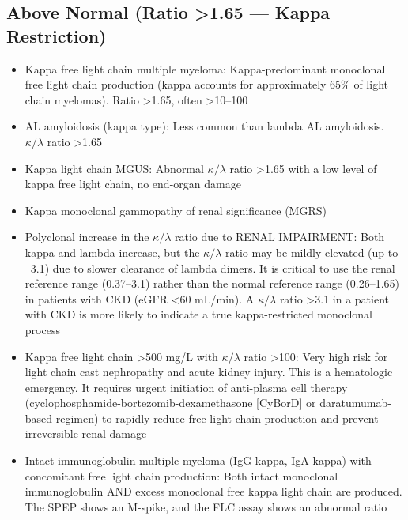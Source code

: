 \subsection*{Above Normal (Ratio >1.65 --- Kappa Restriction)}
\begin{itemize}
  \item Kappa free light chain multiple myeloma: Kappa-predominant monoclonal free light chain production (kappa accounts for approximately 65\% of light chain myelomas). Ratio >1.65, often >10--100
  \item AL amyloidosis (kappa type): Less common than lambda AL amyloidosis. $\kappa/\lambda$ ratio >1.65
  \item Kappa light chain MGUS: Abnormal $\kappa/\lambda$ ratio >1.65 with a low level of kappa free light chain, no end-organ damage
  \item Kappa monoclonal gammopathy of renal significance (MGRS)
  \item Polyclonal increase in the $\kappa/\lambda$ ratio due to RENAL IMPAIRMENT: Both kappa and lambda increase, but the $\kappa/\lambda$ ratio may be mildly elevated (up to ~3.1) due to slower clearance of lambda dimers. It is critical to use the renal reference range (0.37--3.1) rather than the normal reference range (0.26--1.65) in patients with CKD (eGFR <60 mL/min). A $\kappa/\lambda$ ratio >3.1 in a patient with CKD is more likely to indicate a true kappa-restricted monoclonal process
  \item Kappa free light chain >500 mg/L with $\kappa/\lambda$ ratio >100: Very high risk for light chain cast nephropathy and acute kidney injury. This is a hematologic emergency. It requires urgent initiation of anti-plasma cell therapy (cyclophosphamide-bortezomib-dexamethasone [CyBorD] or daratumumab-based regimen) to rapidly reduce free light chain production and prevent irreversible renal damage
  \item Intact immunoglobulin multiple myeloma (IgG kappa, IgA kappa) with concomitant free light chain production: Both intact monoclonal immunoglobulin AND excess monoclonal free kappa light chain are produced. The SPEP shows an M-spike, and the FLC assay shows an abnormal ratio
\end{itemize}

